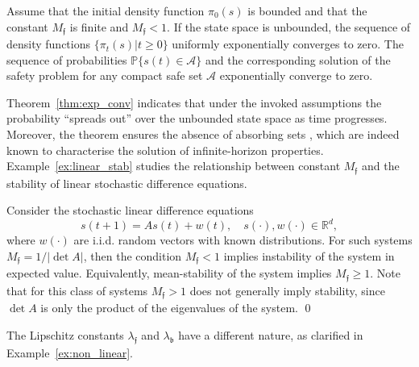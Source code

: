 \documentclass{LMCS}
\begin{document}
\begin{thm}
\label{thm:exp_conv}
Assume that the initial density function $\pi_{0}(s)$ is bounded and that
the constant $M_{\mathfrak f}$ is finite and $M_{\mathfrak f}<1$. 
If the state space is unbounded, the sequence of density functions $\{\pi_t(s)|t\ge 0\}$ uniformly exponentially converges to zero. 
The sequence of probabilities $\mathbb P\{s(t)\in \mathcal A \}$ and the corresponding solution of the safety problem for any compact safe set $\mathcal A$ exponentially converge to zero. 
\end{thm}
Theorem~\ref{thm:exp_conv} indicates that under the invoked assumptions the probability ``spreads out'' over the unbounded state space as time progresses.  
Moreover, the theorem ensures the absence of absorbing sets \cite{ta2011,TA14}, 
which are indeed known to characterise the solution of infinite-horizon properties.
Example~\ref{ex:linear_stab} studies the relationship between constant $M_{\mathfrak f}$ and the stability of linear stochastic difference equations.
\begin{exa}
\label{ex:linear_stab}
Consider the stochastic linear difference equations
\begin{equation*}
s(t+1) = A s(t) + w(t),\quad s(\cdot),w(\cdot)\in\mathbb R^d,
\end{equation*}
where $w(\cdot)$ are i.i.d. random vectors with known distributions.
For such systems $M_{\mathfrak f} = 1/|\det A|$, then the condition $M_{\mathfrak f}<1$ implies instability of the system in expected value.
Equivalently, mean-stability of the system implies $M_{\mathfrak f}\ge 1$. 
Note that for this class of systems $M_{\mathfrak f}>1$ does not generally imply stability, since $\det A$ is only the product of the eigenvalues of the system. \hfill\qed
\end{exa}
The Lipschitz constants $\lambda_{\mathfrak f}$ and $\lambda_{\mathfrak b}$ have a different nature, as clarified in Example~\ref{ex:non_linear}. 
\end{document}
